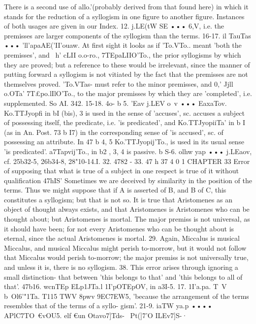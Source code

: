 {{{{{{{{{{{{{{{{{{{{{{{{{{There is a second use of allo.'\vHII (probably derived from that
found here) in which it stands for the reduction of a syllogism
in one figure to another figure. Instances of both usages are given
in our Index.
12. j.LE(tW SE ••• 6,V, i.e. the premisses are larger components
of the syllogism than the terms.
16-17. il TauTas ••• 'll'apaAE('II'ouaw. At first sight it looks as
if 'To.VTo.. meant 'both the premisses', and ~h' cLII o.o-ro., 7TEpaLIIO\I'To.,
the prior syllogisms by which they are proved; but a reference
to these would be irrelevant, since the manner of putting forward
a syllogism is not vitiated by the fact that the premisses are not
themselves proved. 'To.VTas- must refer to the minor premisses,
and 0,' Jjll o.OTa' 7T£po.lIlO\I'To., to the major premisses by which they
are 'completed', i.e. supplemented. So AI. 342. 15-18.
4o- b 5. 'Eav j.LEV o~v ••• EaxaTov. Ko.TTJyopfi in bI (bis), 3 is used
in the sense of 'accuses', sc. accuses a subject of possessing itself,
the predicate, i.e. 'is predicated', and Ko.TTJyopiiTa' in b I (as in
An. Post. 73 b I7) in the corresponding sense of 'is accused', sc.
of possessing an attribute. In 47 b 4, 5 Ko.'TTJyopij'To., is used in its
usual sense 'is predicated'. a7Tapvij'To., in b2 , 3, 4 is passive.
b S-6. olhw yap ••• j.LEaov, cf. 25b32-5, 26b34-8, 28"10-14.I. 32. 4782 - 33. 47 h 37
4 0 1
CHAPTER 33
Error of supposing that what is true of a subject in one respect is
true of it without qualification
47hIS' Sometimes we are deceived by similarity in the position
of the terms. Thus we might suppose that if A is asserted of B,
and B of C, this constitutes a syllogism; but that is not so. It is
true that Aristomenes as an object of thought always exists, and
that Aristomenes is Aristomenes who can be thought about; but
Aristomenes is mortal. The major premiss is not universal, as it
should have been; for not every Aristomenes who can be thought
about is eternal, since the actual Aristomenes is mortal.
29. Again, Miccalus is musical Miccalus, and musical Miccalus
might perish to-morrow, but it would not follow that Miccalus
would perish to-morrow; the major premiss is not universally true,
and unless it is, there is no syllogism.
38. This error arises through ignoring a small distinction-
that between 'this belongs to that' and 'this belongs to all of that'.
47b16. wcnTEp ELp1JTa.l 1I'pOTEpOV, in a3I-5.
17. 1I'a.pa. T~V b~Ol6'"1Ta. T115 TWV 8pwv 9EC7EW5, 'because the
arrangement of the terms resembles that of the terms of a syllo-
gism'.
21-9. iaTW ya.p •••• APlC7TO~€vOU5. elf{ €un Otavo7]Tds- ~Pt(]7'O­
ILEv7]S-·
}}}}}}}}}}}}}}}}}}}}}}}}}}}
